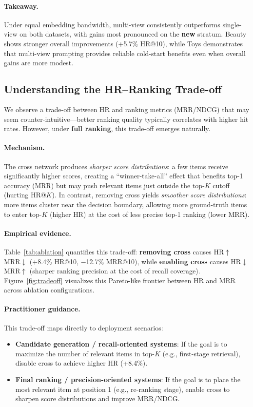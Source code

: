 \paragraph{Takeaway.}
Under equal embedding bandwidth, multi-view consistently outperforms
single-view on both datasets, with gains most pronounced on the
\textbf{new} stratum. Beauty shows stronger overall improvements
(+5.7\% HR@10), while Toys demonstrates that multi-view prompting
provides reliable cold-start benefits even when overall gains are
more modest.

\subsection{Understanding the HR--Ranking Trade-off}

We observe a trade-off between HR and ranking metrics (MRR/NDCG) that
may seem counter-intuitive---better ranking quality typically correlates
with higher hit rates. However, under \textbf{full ranking}, this
trade-off emerges naturally.

\paragraph{Mechanism.}
The cross network produces \emph{sharper score distributions}:
a few items receive significantly higher scores, creating a
``winner-take-all'' effect that benefits top-1 accuracy (MRR)
but may push relevant items just outside the top-$K$ cutoff (hurting HR@$K$).
In contrast, removing cross yields \emph{smoother score distributions}:
more items cluster near the decision boundary,
allowing more ground-truth items to enter top-$K$ (higher HR)
at the cost of less precise top-1 ranking (lower MRR).

\paragraph{Empirical evidence.}
Table~\ref{tab:ablation} quantifies this trade-off:
\textbf{removing cross} causes HR$\uparrow$ MRR$\downarrow$
(+8.4\% HR@10, $-$12.7\% MRR@10), while
\textbf{enabling cross} causes HR$\downarrow$ MRR$\uparrow$
(sharper ranking precision at the cost of recall coverage).
Figure~\ref{fig:tradeoff} visualizes this Pareto-like frontier
between HR and MRR across ablation configurations.

\paragraph{Practitioner guidance.}
This trade-off maps directly to deployment scenarios:
\begin{itemize}[leftmargin=*,itemsep=2pt]
  \item \textbf{Candidate generation / recall-oriented systems}:
    If the goal is to maximize the number of relevant items in top-$K$
    (e.g., first-stage retrieval), disable cross to achieve higher HR (+8.4\%).
  \item \textbf{Final ranking / precision-oriented systems}:
    If the goal is to place the most relevant item at position 1 (e.g., re-ranking stage),
    enable cross to sharpen score distributions and improve MRR/NDCG.
\end{itemize}

